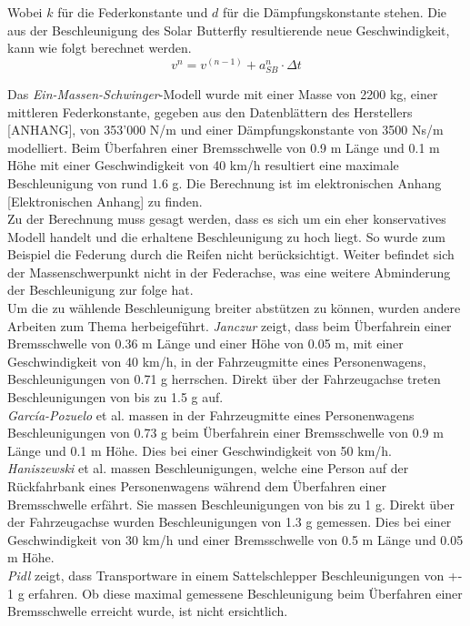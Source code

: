 \begin{description}
    Wobei $k$ für die Federkonstante und $d$ für die Dämpfungskonstante stehen.
    Die aus der Beschleunigung des Solar Butterfly resultierende neue Geschwindigkeit, kann wie folgt berechnet werden.
    \begin{equation}
      v^n = v^{(n-1)} + a_{SB}^n \cdot \Delta t
    \end{equation}

    Das \emph{Ein-Massen-Schwinger}-Modell wurde mit einer Masse von 2200 kg, einer mittleren Federkonstante, gegeben aus den Datenblättern des Herstellers [ANHANG], von 353'000 N/m und einer Dämpfungskonstante von 3500 Ns/m modelliert. Beim Überfahren einer Bremsschwelle von 0.9 m Länge und 0.1 m Höhe mit einer Geschwindigkeit von 40 km/h resultiert eine maximale Beschleunigung von rund 1.6 g. Die Berechnung ist im elektronischen Anhang [Elektronischen Anhang] zu finden.\\
    Zu der Berechnung muss gesagt werden, dass es sich um ein eher konservatives Modell handelt und die erhaltene Beschleunigung zu hoch liegt. So wurde zum Beispiel die Federung durch die Reifen nicht berücksichtigt. Weiter befindet sich der Massenschwerpunkt nicht in der Federachse, was eine weitere Abminderung der Beschleunigung zur folge hat.\\

    Um die zu wählende Beschleunigung breiter abstützen zu können, wurden andere Arbeiten zum Thema herbeigeführt. \emph{Janczur} \cite{Beschl.1} zeigt, dass beim Überfahrein einer Bremsschwelle von 0.36 m Länge und einer Höhe von 0.05 m, mit einer Geschwindigkeit von 40 km/h, in der Fahrzeugmitte eines Personenwagens, Beschleunigungen von 0.71 g herrschen. Direkt über der Fahrzeugachse treten Beschleunigungen von bis zu 1.5 g auf.\\
    \emph{García-Pozuelo} et al. \cite{Beschl.2} massen in der Fahrzeugmitte eines Personenwagens Beschleunigungen von 0.73 g beim Überfahrein einer Bremsschwelle von 0.9 m Länge und 0.1 m Höhe. Dies bei einer Geschwindigkeit von 50 km/h.\\
    \emph{Haniszewski} et al. \cite{Beschl.3} massen Beschleunigungen, welche eine Person auf der Rückfahrbank eines Personenwagens während dem Überfahren einer Bremsschwelle erfährt. Sie massen Beschleunigungen von bis zu 1 g. Direkt über der Fahrzeugachse wurden Beschleunigungen von 1.3 g gemessen. Dies bei einer Geschwindigkeit von 30 km/h und einer Bremsschwelle von 0.5 m Länge und 0.05 m Höhe.\\
    \emph{Pidl} \cite{Beschl.4} zeigt, dass Transportware in einem Sattelschlepper Beschleunigungen von +- 1 g erfahren. Ob diese maximal gemessene Beschleunigung beim Überfahren einer Bremsschwelle erreicht wurde, ist nicht ersichtlich.


\end{description}
